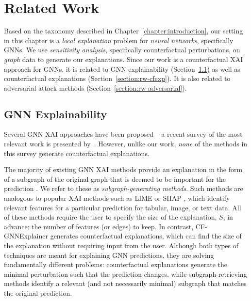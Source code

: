 
\section{Related Work}
\label{section:focus-relatedwork}
Based on the taxonomy described in Chapter~\ref{chapter:introduction}, our setting in this chapter is a \emph{local explanation} problem for \emph{neural networks}, specifically GNNs. 
We use \emph{sensitivity analysis}, specifically counterfactual perturbations, on \emph{graph} data to generate our explanations. 
Since our work is a counterfactual XAI approach for GNNs, it is related to GNN explainability (Section~\ref{section:rw-gnnxai}) as well as counterfactual explanations (Section~\ref{section:rw-cfexp}). It is also related to adversarial attack methods (Section~\ref{section:rw-adversarial}).

\subsection{GNN Explainability}
\label{section:rw-gnnxai}
Several GNN XAI approaches have been proposed -- a recent survey of the most relevant work is presented by~\citet{yuan2020explainability}.
However, unlike our work, {\em none} of the methods in this survey generate counterfactual explanations. 

The majority of existing GNN XAI methods provide an explanation in the form of a subgraph of the original graph that is deemed to be important for the prediction \citep{yuan2020explainability,baldassarre_explainability_2019,duval2021graphsvx,lin_causal_2021,luo_parameterized_2020,pope_explainability_2019,schlichtkrull_interpreting_2020,vu2020pgmexplainer,ying_gnnexplainer_2019,yuan_subgraph_2021}. We refer to these as \emph{subgraph-generating methods}. 
Such methods are analogous to popular XAI methods such as LIME \citep{ribeiro-2016-should} or SHAP \citep{lundberg_unified_2017}, which identify relevant features for a particular prediction for tabular, image, or text data. 
All of these methods require the user to specify the size of the explanation, $S$, in advance: the number of features (or edges) to keep. 
In contrast, CF-GNNExplainer generates counterfactual explanations, which can find the size of the explanation without requiring input from the user. 
Although both types of techniques are meant for explaining GNN predictions, they are solving fundamentally different problems: counterfactual explanations generate the minimal perturbation such that the prediction changes, while subgraph-retrieving methods identify a relevant (and not necessarily minimal) subgraph that matches the original prediction. 

